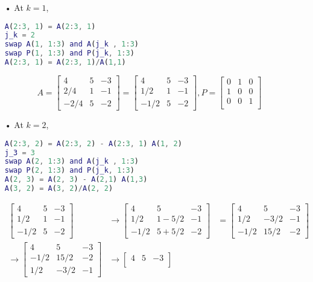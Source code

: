 \documentclass[11pt]{article}
\begin{document}
\begin{enumerate}
\begin{itemize}
\item[•]At $k=1$,
\begin{lstlisting}[language=matlab]
A(2:3, 1) = A(2:3, 1)
j_k = 2
swap A(1, 1:3) and A(j_k , 1:3)
swap P(1, 1:3) and P(j_k, 1:3)
A(2:3, 1) = A(2:3, 1)/A(1,1)
\end{lstlisting}
$$A = \begin{bmatrix}
4 & 5 & -3\\
2/4 & 1 & -1\\
-2/4& 5 & -2
\end{bmatrix} = \begin{bmatrix}
4 & 5 & -3\\
1/2 & 1 & -1\\
-1/2& 5 & -2
\end{bmatrix}, P = \begin{bmatrix}
0 &1 &0 \\
1& 0& 0\\
0& 0& 1\\
\end{bmatrix}$$
\item[•] At $k=2$,
\begin{lstlisting}[language=matlab]
A(2:3, 2) = A(2:3, 2) - A(2:3, 1) A(1, 2)
j_3 = 3
swap A(2, 1:3) and A(j_k , 1:3)
swap P(2, 1:3) and P(j_k, 1:3)
A(2, 3) = A(2, 3) - A(2,1) A(1,3)
A(3, 2) = A(3, 2)/A(2, 2)
\end{lstlisting}
\begin{align*}
\begin{bmatrix}
4 & 5 & -3\\
1/2 & 1 & -1\\
-1/2& 5 & -2
\end{bmatrix} & \to \begin{bmatrix}
4 & 5 & -3\\
1/2 & 1-5/2 & -1\\
-1/2& 5+5/2 & -2
\end{bmatrix}  &= \begin{bmatrix}
4 & 5 & -3\\
1/2 & -3/2 & -1\\
-1/2& 15/2 & -2
\end{bmatrix}\\
\to \begin{bmatrix}
4 & 5 & -3\\
-1/2& 15/2 & -2 \\
1/2 & -3/2 & -1
\end{bmatrix} &\to \begin{bmatrix}
4 & 5 & -3\\

\end{bmatrix}
\end{align*}
\end{itemize}
\end{enumerate}
\end{document}
